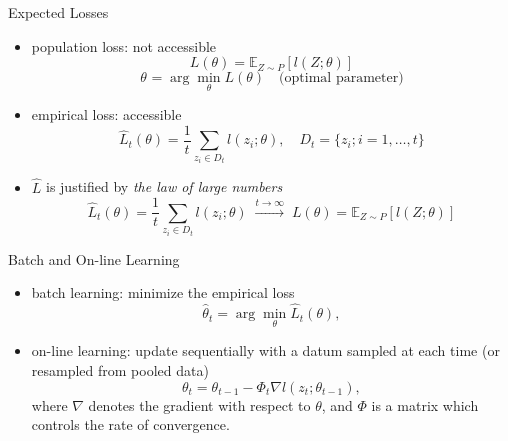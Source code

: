 \documentclass[fleqn,aspectratio=1610]{beamer}
\begin{document}
\begin{frame}[label={sec:orgc6a2352}]{Expected Losses}
\begin{itemize}
\item population loss: not accessible
\begin{equation}
  L(\theta)
  =\mathbb{E}_{Z\sim P}[l(Z;\theta)]
\end{equation}
\begin{equation}
  \theta_{}
  = \arg\min_\theta L(\theta)
  \quad\text{(optimal parameter)}
\end{equation}
\item empirical loss: accessible
\begin{equation}
  \hat{L}_{t}(\theta)
  =\frac{1}{t}\sum_{z_{i}\in D_{t}}l(z_{i};\theta),
  \quad D_{t}=\{z_{i}; i=1,\dotsc,t\}
\end{equation}
\item \(\hat{L}\) is justified by \emph{the law of large numbers}
\begin{equation}
  \hat{L}_{t}(\theta)=\frac{1}{t}\sum_{z_{i}\in {D_{t}}}l(z_{i};\theta)
  \;\xrightarrow{t\to\infty}\;
  L(\theta)
  =\mathbb{E}_{Z\sim P}\left[l(Z;\theta)\right]
\end{equation}
\end{itemize}
\end{frame}

\begin{frame}[label={sec:orge9d9669}]{Batch and On-line Learning}
\begin{itemize}
\item batch learning: minimize the empirical loss
\begin{equation}
  \hat\theta_{t}
  = \arg\min_\theta \hat{L}_{t}(\theta),
\end{equation}
\item on-line learning: update sequentially
with a datum sampled at each time
(or resampled from pooled data)
\begin{equation}
  \theta_{t}
  = \theta_{t-1} - \varPhi_{t}\nabla l(z_{t};\theta_{t-1}),
\end{equation}
where \(\nabla\) denotes the gradient with respect to \(\theta\),
and \(\varPhi\) is a matrix which controls the rate of convergence.
\end{itemize}
\end{frame}
\end{document}
